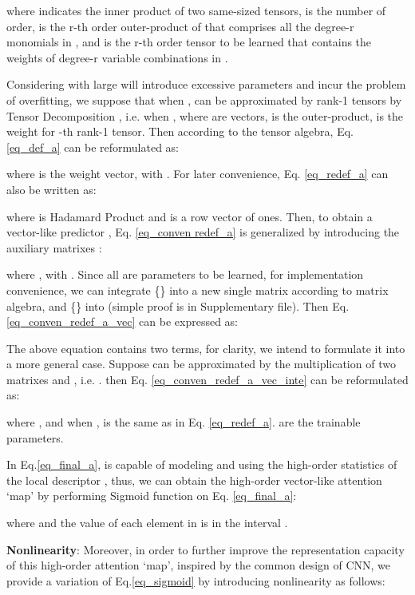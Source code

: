 \documentclass[10pt,twocolumn,letterpaper]{article}
\begin{document}
where  indicates the inner product of two same-sized tensors,  is the number of order,  is the r-th order outer-product of  that comprises all the degree-r monomials in , and  is the r-th order tensor to be learned that contains the weights of degree-r variable combinations in .

Considering  with large  will introduce excessive parameters and incur the problem of overfitting, we suppose that when ,  can be approximated by  rank-1 tensors by Tensor Decomposition \cite{kolda2009tensor}, i.e.  when , where  are vectors,  is the outer-product,  is the weight for -th rank-1 tensor. Then according to the tensor algebra, Eq. \ref{eq_def_a} can be reformulated as:
\vspace{-0.5em}

where  is the weight vector,  with . For later convenience, Eq. \ref{eq_redef_a} can also be written as:
\vspace{-1em}

where  is Hadamard Product and  is a row vector of ones. Then, to obtain a vector-like predictor , Eq. \ref{eq_conven redef_a} is generalized by introducing the auxiliary matrixes :
\vspace{-1.5em}

where ,  with . Since all  are parameters to be learned, for implementation convenience, we can integrate \{\} into a new single matrix  according to matrix algebra, and \{\} into  (simple proof is in Supplementary file). Then Eq. \ref{eq_conven_redef_a_vec} can be expressed as:
\vspace{-0.5em}


The above equation contains two terms, for clarity, we intend to formulate it into a more general case. Suppose  can be approximated by the multiplication of two matrixes  and , i.e. . then Eq. \ref{eq_conven_redef_a_vec_inte} can be reformulated as:
\vspace{-1em}

where , and when ,  is the same as in Eq. \ref{eq_redef_a}.  are the trainable parameters.

In Eq.\ref{eq_final_a},  is capable of modeling and using the high-order statistics of the local descriptor , thus, we can obtain the high-order vector-like attention `map' by performing Sigmoid function on Eq. \ref{eq_final_a}:
\vspace{-1em}

where  and the value of each element in  is in the interval .

\textbf{Nonlinearity}: Moreover, in order to further improve the representation capacity of this high-order attention `map', inspired by the common design of CNN, we provide a variation of Eq.\ref{eq_sigmoid} by introducing nonlinearity as follows:
\vspace{-0.7em}
\end{document}
